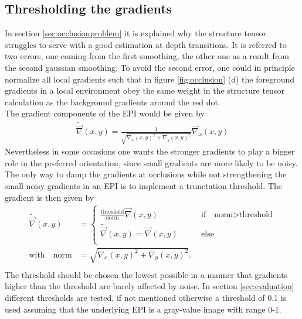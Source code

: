 \documentclass  [
  paper    = a4,
  BCOR     = 10mm,
  twoside,
  fontsize = 12pt,
  fleqn,
  toc      = bibnumbered,
  toc      = listofnumbered,
  numbers  = noendperiod,
  headings = normal,
  listof   = leveldown,
  version  = 3.03
]                                       {scrreprt}
\begin{document}
 \subsection{Thresholding the gradients}
 \label{sec:thresholdinggradients}
 In section \ref{sec:occlusionproblem} it is explained why the structure tensor struggles to serve with a  good estimation at depth transitions. It is referred to two errors, one coming from the first smoothing, the other one as a result from the second gaussian smoothing. To avoid the second error, one could in principle normalize all local gradients such that in figure \ref{fig:occlusion} (d) the foreground gradients in a local environment obey the same weight in the structure tensor calculation as the background gradients around the red dot.\\
 The gradient components of the EPI would be given by
 \begin{align}
 	\tilde{\vec \nabla}(x,y) = \frac{1}{\sqrt{\nabla_x(x,y)^2 + \nabla_y(x,y)^2}} \vec \nabla_x(x,y)
 \end{align}
 Nevertheless in some occasions one wants the stronger gradients to play a bigger role in the preferred orientation, since small gradients are more likely to be noisy. The only way to damp the gradients at occlusions while not strengthening the small noisy gradients in an EPI is to implement a trunctation threshold. The gradient is then given by
 \begin{align}
 \tilde{\vec \nabla}(x,y) &= \begin{cases}
\frac{\text{threshold}}{\text{norm}} \vec \nabla(x,y) \quad &\text{if}\quad \text{norm}> \text{threshold}\\
\tilde{\vec \nabla}(x,y) =  \vec \nabla(x,y)\qquad &\text{else}\\
 \end{cases} \\
\text{with} \quad \text{norm} &= \sqrt{\nabla_x(x,y)^2 + \nabla_y(x,y)^2}.\\
 \end{align}
 The threshold should be chosen the lowest possible in a manner that gradients higher than the threshold are barely affected by noise. In section \ref{sec:evaluation} different thresholds are tested, if not mentioned otherwise a threshold of 0.1 is used assuming that the underlying EPI is a gray-value image with range 0-1.\\
 
\end{document}
